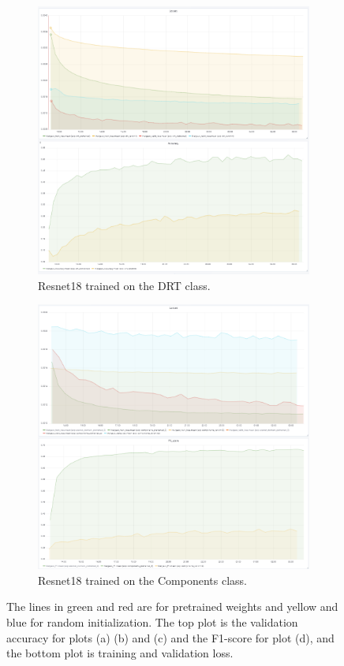 \begin{figure}
\begin{subfigure}{.5\textwidth}
  \centering
  \includegraphics[width=.8\linewidth]{figures/04-Init_drt_acc.PNG}
  \caption{Resnet18 trained on the DRT class.}
  \label{fig:resinit_drt}
\end{subfigure}%
\begin{subfigure}{.5\textwidth}
  \centering
  \includegraphics[width=.8\linewidth]{figures/04-Init_components_acc.PNG}
  \caption{Resnet18 trained on the Components class.}
  \label{fig:resinit_compo}
\end{subfigure}
\caption[Training and validation plots for Resnet 18]{The lines in green and red are for pretrained weights and yellow and blue for random initialization. The top plot is the validation accuracy for plots (a) (b) and (c) and the F1-score for plot (d), and the bottom plot is training  and validation loss.}
\label{fig:plotsres}
\end{figure}
